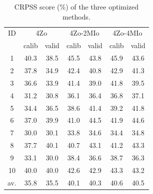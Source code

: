 \documentclass[5p]{elsarticle}
\begin{document}
\begin{table}[htbp]
	\caption{CRPSS score (\%) of the three optimized methods.}
	\footnotesize
	\begin{center}
		\begin{tabular}{ccccccc}
			\hline 
			ID & \multicolumn{2}{c}{4Zo} & \multicolumn{2}{c}{4Zo-2MIo} & \multicolumn{2}{c}{4Zo-4MIo} \\ 
			& calib & valid & calib & valid & calib & valid \\ 
			\hline 
			1 & 40.3 & 38.5 & 45.5 & 43.8 & 45.9 & 43.6 \\
			2 & 37.8 & 34.9 & 42.4 & 40.8 & 42.9 & 41.3 \\
			3 & 36.6 & 33.9 & 41.4 & 39.0 & 41.8 & 39.5 \\
			4 & 31.2 & 30.8 & 36.1 & 36.4 & 36.8 & 37.1 \\
			5 & 34.4 & 36.5 & 38.6 & 41.4 & 39.2 & 41.8 \\
			6 & 37.0 & 39.9 & 41.0 & 44.5 & 41.9 & 44.6 \\
			7 & 30.0 & 30.1 & 33.8 & 34.6 & 34.4 & 34.8 \\
			8 & 37.7 & 40.1 & 40.7 & 43.1 & 41.2 & 43.3 \\
			9 & 33.1 & 30.0 & 38.4 & 36.6 & 38.7 & 36.3 \\
			10 & 40.0 & 40.0 & 42.6 & 42.9 & 43.3 & 43.2 \\
			\hline
			av. & 35.8 & 35.5 & 40.1 & 40.3 & 40.6 & 40.5 \\ 
			\hline 
		\end{tabular} 
	\end{center}
	\label{table:scores}
\end{table}
\end{document}
